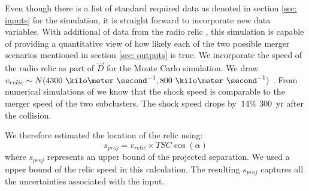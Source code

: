 \label{sec: positionprior}





Even though there is a list of standard required data as denoted in section
\ref{sec: inputs} for the simulation, it is straight forward to incorporate
new data variables. With additional of data from the radio relic
\citep{L13}, this simulation is capable of providing a quantitative view of
how likely each of  the two possible merger scenarios mentioned in section
\ref{sec: outputs} is true. We incorporate the speed of the radio relic as
part of $\vec{D}$ for the Monte Carlo simulation. We draw  $v_{relic} \sim
N(4300~\kilo\meter~\second^{-1}, 800~\kilo\meter~\second^{-1})$
\citep{L13}.  From numerical simulations of \citet{Springel2007} we know that the shock speed is comparable to the
merger speed of the two subclusters. The shock speed drops by $~14\%$
300~\Mega yr after the collision. 

We therefore estimated the location of the relic using:
\begin{equation}
s_{proj} = v_{relic} \times TSC \cos(\alpha) 
\end{equation}
where $s_{proj}$ represents an upper bound of the projected separation. We used a upper bound of the relic speed in this calculation.
The resulting $s_{proj}$ captures all the uncertainties associated with
the input. 



\par      

